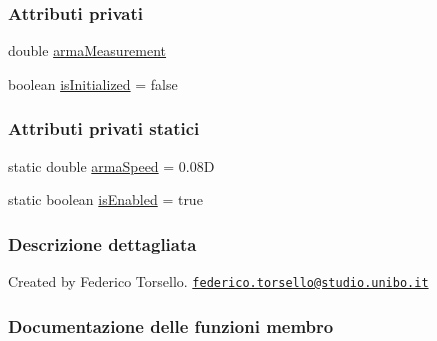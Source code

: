\subsubsection*{Attributi privati}
\begin{DoxyCompactItemize}
\item 
double \hyperlink{classit_1_1unibo_1_1torsello_1_1bluetoothpositioning_1_1configuration_1_1MyArmaRssiFilter_a2be11d7395143321b8f2063afe14a8d0_a2be11d7395143321b8f2063afe14a8d0}{arma\+Measurement}
\item 
boolean \hyperlink{classit_1_1unibo_1_1torsello_1_1bluetoothpositioning_1_1configuration_1_1MyArmaRssiFilter_a01cc7f81fd8e0ca8ed3c197d9fc1fd11_a01cc7f81fd8e0ca8ed3c197d9fc1fd11}{is\+Initialized} = false
\end{DoxyCompactItemize}
\subsubsection*{Attributi privati statici}
\begin{DoxyCompactItemize}
\item 
static double \hyperlink{classit_1_1unibo_1_1torsello_1_1bluetoothpositioning_1_1configuration_1_1MyArmaRssiFilter_a5332b55e26b28536d1f8c7cae5e684b4_a5332b55e26b28536d1f8c7cae5e684b4}{arma\+Speed} = 0.\+08D
\item 
static boolean \hyperlink{classit_1_1unibo_1_1torsello_1_1bluetoothpositioning_1_1configuration_1_1MyArmaRssiFilter_a7a046687ef0d8dd63307cabfbb33fcf8_a7a046687ef0d8dd63307cabfbb33fcf8}{is\+Enabled} = true
\end{DoxyCompactItemize}


\subsubsection{Descrizione dettagliata}
Created by Federico Torsello. \href{mailto:federico.torsello@studio.unibo.it}{\tt federico.\+torsello@studio.\+unibo.\+it} 

\subsubsection{Documentazione delle funzioni membro}
\hypertarget{classit_1_1unibo_1_1torsello_1_1bluetoothpositioning_1_1configuration_1_1MyArmaRssiFilter_ad35f023bd49df5d11db274ad6a900072_ad35f023bd49df5d11db274ad6a900072}{}\label{classit_1_1unibo_1_1torsello_1_1bluetoothpositioning_1_1configuration_1_1MyArmaRssiFilter_ad35f023bd49df5d11db274ad6a900072_ad35f023bd49df5d11db274ad6a900072} 

